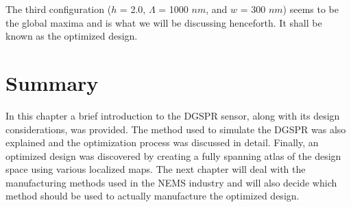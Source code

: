 The third configuration ($h$ = 2.0, $\Lambda$ = 1000 $nm$, and $w$ = 300 $nm$) seems to be the global maxima and is what we will be discussing henceforth. It shall be known as the optimized design.

\section{Summary}

In this chapter a brief introduction to the DGSPR sensor, along with its design considerations, was provided. The method used to simulate the DGSPR was also explained and the optimization process was discussed in detail. Finally, an optimized design was discovered by creating a fully spanning atlas of the design space using various localized maps. The next chapter will deal with the manufacturing methods used in the NEMS industry and will also decide which method should be used to actually manufacture the optimized design. 
